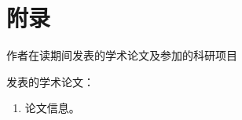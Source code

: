 
\chapter*{附录}

\begin{center}
    作者在读期间发表的学术论文及参加的科研项目
\end{center}

发表的学术论文：
\begin{enumerate}
    \item 论文信息。
\end{enumerate}

